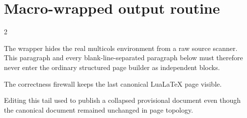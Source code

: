 \documentclass{article}
\newcommand\OpenLedgerColumns{\setlength{\columnsep}{18pt}\begin{multicols}{2}}
\newcommand\CloseLedgerColumns{\end{multicols}}
\begin{document}
\section{Macro-wrapped output routine}

\OpenLedgerColumns

The wrapper hides the real multicols environment from a raw source scanner.
This paragraph and every blank-line-separated paragraph below must therefore
never enter the ordinary structured page builder as independent blocks.

The correctness firewall keeps the last canonical LuaLaTeX page visible.

\columnbreak

Editing this tail used to publish a collapsed provisional document even
though the canonical document remained unchanged in page topology.

\CloseLedgerColumns
\end{document}
